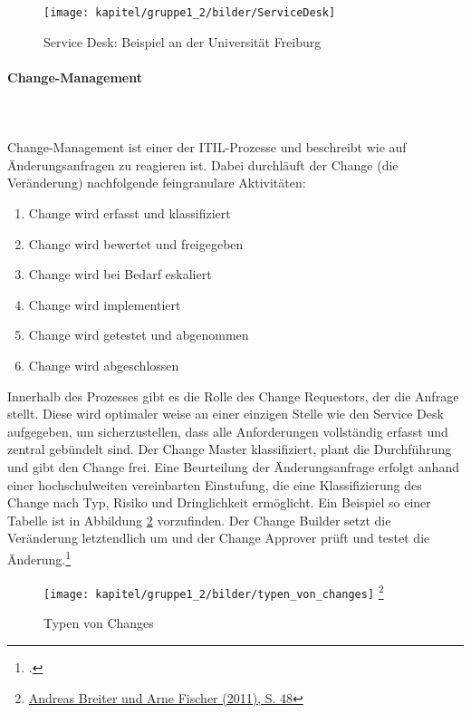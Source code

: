 \begin{figure}[h!]
	\centering
	\texttt{[image: kapitel/gruppe1\_2/bilder/ServiceDesk]}
	\caption{Service Desk: Beispiel an der Universität Freiburg} 
	\label{fig_service_desk}
\end{figure}

 

\paragraph{Change-Management}\mbox{}\\\\
Change-Management ist einer der ITIL-Prozesse und beschreibt wie auf Änderungsanfragen zu reagieren ist. Dabei durchläuft der Change (die Veränderung) nachfolgende feingranulare Aktivitäten:

\begin{enumerate}
    \item Change wird erfasst und klassifiziert
    \item Change wird bewertet und freigegeben
    \item Change wird bei Bedarf eskaliert
    \item Change wird implementiert
    \item Change wird getestet und abgenommen
    \item Change wird abgeschlossen
\end{enumerate}

Innerhalb des Prozesses gibt es die Rolle des Change Requestors, der die Anfrage stellt. Diese wird optimaler weise an einer einzigen Stelle wie den Service Desk aufgegeben, um sicherzustellen, dass alle Anforderungen vollständig erfasst und zentral gebündelt sind. Der Change Master klassifiziert, plant die Durchführung und gibt den Change frei. Eine Beurteilung der Änderungsanfrage erfolgt anhand einer hochschulweiten vereinbarten Einstufung, die eine Klassifizierung des Change nach Typ, Risiko und Dringlichkeit ermöglicht. Ein Beispiel so einer Tabelle ist in Abbildung \ref{fig_typenvonchange} vorzufinden. Der Change Builder setzt die Veränderung letztendlich um und der Change Approver prüft und testet die Änderung.\footcite{Zitat fehlt}
 
\begin{figure}[h!]
	\centering
	\texttt{[image: kapitel/gruppe1\_2/bilder/typen\_von\_changes]} 
	\footnote{\url{Andreas Breiter und Arne Fischer (2011), S. 48}}
	\caption{Typen von Changes}
	\label{fig_typenvonchange}
\end{figure}



